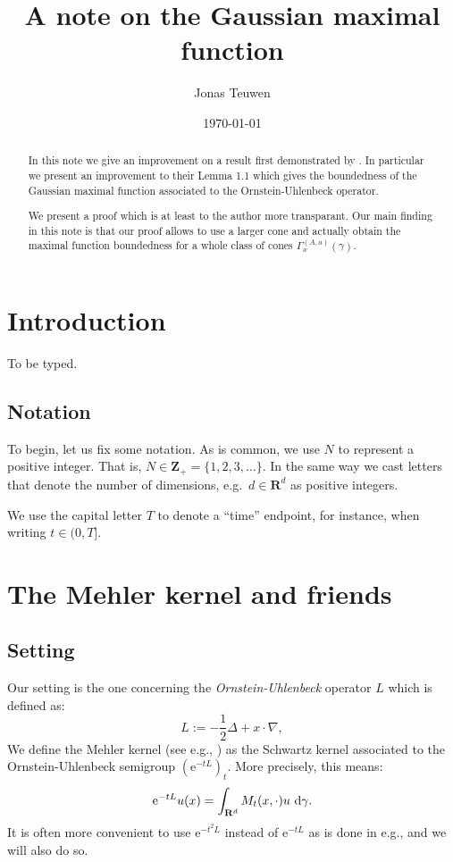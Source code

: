\documentclass[a4paper,oneside,10pt]{amsproc}
\title[Gaussian maximal functions]{A note on the Gaussian maximal function}
\author{Jonas Teuwen}%
\date{\today}
\theoremstyle{plain}
\theoremstyle{remark}
\theoremstyle{definition}
\newcommand{\D}{\,\textup{d}}
\newcommand{\R}{\mathbf R}
\newcommand{\Z}{\mathbf Z}
\newcommand{\e}{\mathrm{e}} %
\begin{document}
\begin{abstract}
  In this note we give an improvement on a result first demonstrated
  by \textcite{Pineda2008}. In particular we present an improvement to
  their Lemma 1.1 which gives the boundedness of the
  Gaussian maximal function associated to the Ornstein-Uhlenbeck
  operator.

  We present a proof which is at least to the author more transparant.
  Our main finding in this note is that our proof allows to use a
  larger cone and actually obtain the maximal function boundedness for
  a whole class of cones $\Gamma^{(A, a)}_x(\gamma)$.
\end{abstract}


\maketitle
\section{Introduction}
To be typed.

\subsection{Notation}
To begin, let us fix some notation. As is common, we use $N$ to
represent a positive integer. That is, $N \in \Z_+ = \{1, 2, 3,
\dots\}$. In the same way we cast letters that denote the number of
dimensions, e.g.\ $d \in \R^d$ as positive integers.

We use the capital letter $T$ to denote a ``time'' endpoint, for
instance, when writing $t \in (0, T]$.

%
%
%

\section{The Mehler kernel and friends}
\subsection{Setting}
Our setting is the one concerning the \emph{Ornstein-Uhlenbeck}
operator $L$ which is defined as:
\begin{equation}
  \label{eq:Ornstein-Uhlenbeck-operator}
  L := -\frac12 \Delta + x \cdot \nabla,
\end{equation}
We define the Mehler kernel (see e.g., \textcite{Sjogren1997}) as the
Schwartz kernel associated to the Ornstein-Uhlenbeck semigroup
$(\e^{-tL})_t$. More precisely, this means:
\begin{equation}
  \label{eq:Ornstein-Uhlenbeck-semigroup-integral}
  \e^{-tL} u(x) = \int_{\R^d} M_t(x, \cdot) u \, \D\gamma.
\end{equation}
It is often more convenient to use $\e^{-t^2 L}$ instead of $\e^{-tL}$
as is done in e.g., \textcite{Portal2012} and we will also do so.
\end{document}
